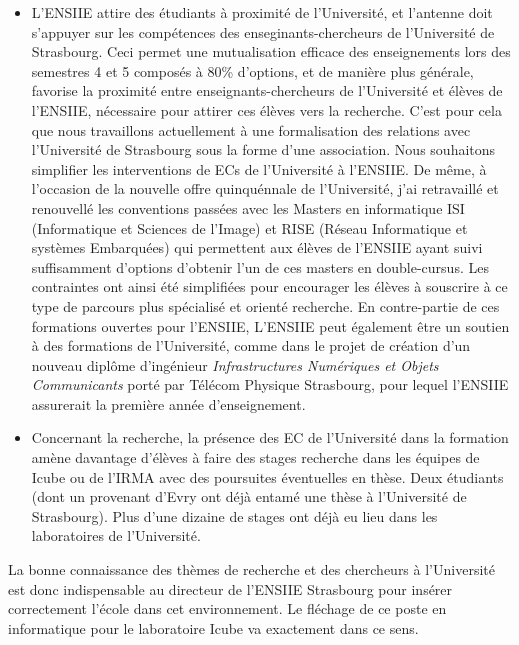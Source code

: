 \documentclass[11pt]{article}
\begin{document}
\begin{itemize}
\item L'ENSIIE  attire des étudiants  à proximité de l'Université,  et l'antenne
  doit s'appuyer sur les  compétences des enseginants-chercheurs de l'Université
  de Strasbourg.  Ceci permet une  mutualisation efficace des enseignements lors
  des semestres 4 et  5 composés à 80\% d'options, et  de manière plus générale,
  favorise la  proximité entre enseignants-chercheurs de  l'Université et élèves
  de l'ENSIIE, nécessaire pour attirer ces élèves vers la recherche.  C'est pour
  cela que nous travaillons actuellement  à une formalisation des relations avec
  l'Université de Strasbourg  sous la forme d'une  association.  Nous souhaitons
  simplifier les  interventions de ECs  de l'Université  à l'ENSIIE. De  même, à
  l'occasion de la nouvelle offre quinquénnale de l'Université, j'ai retravaillé
  et renouvellé  les conventions  passées avec les  Masters en  informatique ISI
  (Informatique et Sciences de l'Image) et RISE (Réseau Informatique et systèmes
  Embarquées) qui  permettent aux  élèves de  l'ENSIIE ayant  suivi suffisamment
  d'options d'obtenir l'un de ces  masters en double-cursus. Les contraintes ont
  ainsi été  simplifiées pour  encourager les  élèves à souscrire  à ce  type de
  parcours  plus  spécialisé et  orienté  recherche.   En contre-partie  de  ces
  formations ouvertes pour  l'ENSIIE, L'ENSIIE peut également être  un soutien à
  des formations de l'Université, comme dans  le projet de création d'un nouveau
  diplôme d'ingénieur \textit{Infrastructures Numériques et Objets Communicants}
  porté  par Télécom  Physique Strasbourg,  pour lequel  l'ENSIIE assurerait  la
  première année d'enseignement.

\item  Concernant la  recherche,  la présence  des EC  de  l'Université dans  la
  formation  amène davantage  d'élèves à  faire  des stages  recherche dans  les
  équipes de Icube ou de l'IRMA  avec des poursuites éventuelles en thèse.  Deux
  étudiants (dont un  provenant d'Evry ont déjà entamé une  thèse à l'Université
  de  Strasbourg). Plus  d'une  dizaine de  stages  ont déjà  eu  lieu dans  les
  laboratoires de l'Université. 


\end{itemize}

La bonne connaissance  des thèmes de recherche et des  chercheurs à l'Université
est  donc  indispensable  au  directeur  de  l'ENSIIE  Strasbourg  pour  insérer
correctement  l'école  dans cet  environnement.   Le  fléchage  de ce  poste  en
informatique pour le laboratoire Icube va exactement dans ce sens.
\end{document}
